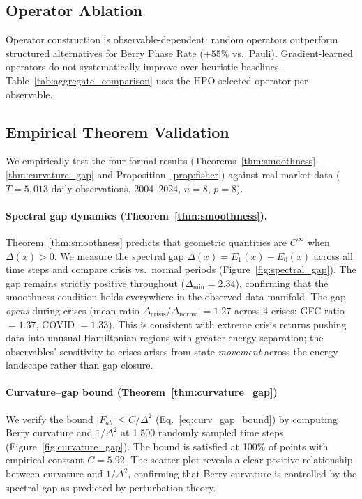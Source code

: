 \documentclass[3p]{elsarticle}
\begin{document}
\subsection{Operator Ablation}\label{subsec:operator_ablation}

Operator construction is observable-dependent: random operators
outperform structured alternatives for Berry Phase Rate ($+55\%$
vs.\ Pauli).  Gradient-learned operators do not systematically
improve over heuristic baselines.
Table~\ref{tab:aggregate_comparison} uses the HPO-selected operator
per observable.

\subsection{Empirical Theorem Validation}\label{subsec:theorem_validation}

We empirically test the four formal results
(Theorems~\ref{thm:smoothness}--\ref{thm:curvature_gap} and
Proposition~\ref{prop:fisher}) against real market data ($T = 5{,}013$
daily observations, 2004--2024, $n = 8$, $p = 8$).

\paragraph{Spectral gap dynamics (Theorem~\ref{thm:smoothness}).}
Theorem~\ref{thm:smoothness} predicts that geometric quantities are
$C^\infty$ when $\Delta(x) > 0$.  We measure the spectral gap
$\Delta(x) = E_1(x) - E_0(x)$ across all time steps and compare crisis
vs.\ normal periods (Figure~\ref{fig:spectral_gap}).  The gap remains
strictly positive throughout ($\Delta_{\min} = 2.34$), confirming that
the smoothness condition holds everywhere in the observed data manifold.
The gap \emph{opens} during crises (mean ratio
$\Delta_{\text{crisis}} / \Delta_{\text{normal}} = 1.27$ across 4
crises; GFC ratio $= 1.37$, COVID $= 1.33$).  This is consistent with
extreme crisis returns pushing data into unusual Hamiltonian regions with
greater energy separation; the observables' sensitivity to crises
arises from state \emph{movement} across the energy landscape rather
than gap closure.

\paragraph{Curvature--gap bound (Theorem~\ref{thm:curvature_gap})}
We verify the bound
$|F_{ab}| \leq C / \Delta^2$ (Eq.~\ref{eq:curv_gap_bound}) by
computing Berry curvature and $1/\Delta^2$ at 1{,}500 randomly sampled
time steps (Figure~\ref{fig:curvature_gap}).  The bound is satisfied at
100\% of points with empirical constant $C = 5.92$.  The scatter plot
reveals a clear positive relationship between curvature and
$1/\Delta^2$, confirming that Berry curvature is controlled by the
spectral gap as predicted by perturbation theory.
\end{document}
